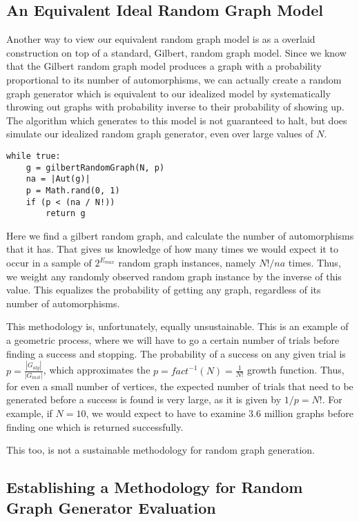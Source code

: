 \subsection{An Equivalent Ideal Random Graph Model}

Another way to view our equivalent random graph model is as a overlaid construction on top of a standard, Gilbert, random graph model.
Since we know that the Gilbert random graph model produces a graph with a probability proportional to its number of automorphisms, we can actually create a random graph generator which is equivalent to our idealized model by systematically throwing out graphs with probability inverse to their probability of showing up.
The algorithm which generates to this model is not guaranteed to halt, but does simulate our idealized random graph generator, even over large values of $N$.

\begin{lstlisting}[frame=single]
while true:
	g = gilbertRandomGraph(N, p)
	na = |Aut(g)|
	p = Math.rand(0, 1)
	if (p < (na / N!))
		return g
\end{lstlisting}

Here we find a gilbert random graph, and calculate the number of automorphisms that it has.
That gives us knowledge of how many times we would expect it to occur in a sample of $2^{E_{max}}$ random graph instances, namely $N! / na$ times.
Thus, we weight any randomly observed random graph instance by the inverse of this value.
This equalizes the probability of getting any graph, regardless of its number of automorphisms.

This methodology is, unfortunately, equally unsustainable.
This is an example of a geometric process, where we will have to go a certain number of trials before finding a success and stopping. 
The probability of a success on any given trial is $p = \frac{|G_{alg}|}{|G_{inst}|}$, which approximates the $p = fact^{-1}(N) = \frac{1}{N!}$ growth function.
Thus, for even a small number of vertices, the expected number of trials that need to be generated before a success is found is very large, as it is given by $1/p = N!$. 
For example, if $N=10$, we would expect to have to examine 3.6 million graphs before finding one which is returned successfully.

This too, is not a sustainable methodology for random graph generation.

\subsection{Establishing a Methodology for Random Graph Generator Evaluation}

